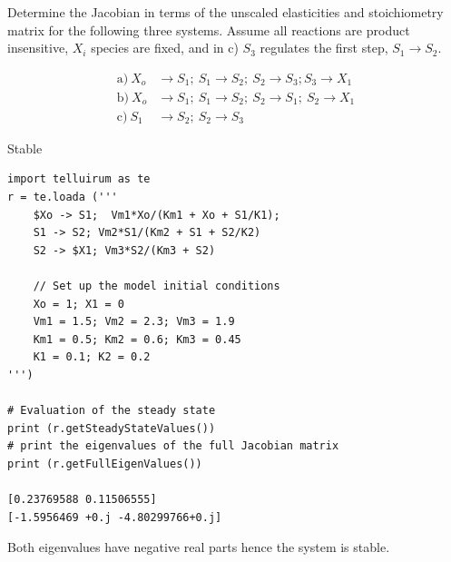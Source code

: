 \documentclass[12pt]{article}
\begin{document}
\begin{question}
Determine the Jacobian in terms of the unscaled elasticities and stoichiometry matrix for the following three systems. Assume all reactions are product insensitive, $X_i$ species are fixed, and in c) $S_3$ regulates the first step, $S_1 \rightarrow S_2$.


\begin{align*}
\text{a)}\ X_o &\rightarrow S_1;\ S_1 \rightarrow S_2;\ S_2 \rightarrow S_3; S_3 \rightarrow X_1\\[5pt]
\text{b)}\ X_o &\rightarrow S_1;\ S_1 \rightarrow S_2;\ S_2 \rightarrow S_1;\ S_2 \rightarrow X_1\\[5pt]
\text{c)}\ S_1 &\rightarrow S_2;\ S_2 \rightarrow S_3
\end{align*}

\end{question}
\cprotEnv\begin{solution}
Stable
\begin{verbatim}
import telluirum as te
r = te.loada ('''
    $Xo -> S1;  Vm1*Xo/(Km1 + Xo + S1/K1);
    S1 -> S2; Vm2*S1/(Km2 + S1 + S2/K2)
    S2 -> $X1; Vm3*S2/(Km3 + S2)

    // Set up the model initial conditions
    Xo = 1; X1 = 0
    Vm1 = 1.5; Vm2 = 2.3; Vm3 = 1.9
    Km1 = 0.5; Km2 = 0.6; Km3 = 0.45
    K1 = 0.1; K2 = 0.2
''')

# Evaluation of the steady state
print (r.getSteadyStateValues())
# print the eigenvalues of the full Jacobian matrix
print (r.getFullEigenValues())

[0.23769588 0.11506555]
[-1.5956469 +0.j -4.80299766+0.j]
\end{verbatim}

Both eigenvalues have negative real parts hence the system is stable.
\end{solution}
\end{document}
